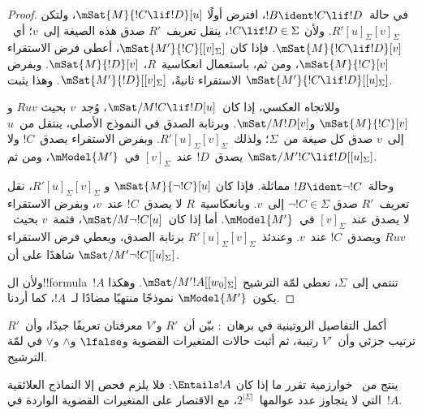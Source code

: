 \documentclass[../../../include/open-logic-section]{subfiles}
\begin{document}
\begin{proof}
  في حالة~$!B\ident !C\lif !D$، افترض أولًا
  $\mSat{M}{!C\lif !D}[u]$، ولتكن
  $R'{[u]_\Sigma}{[v]_\Sigma}$. ولأن
  $!C\lif !D\in\Sigma$، ينقل تعريف~$R'$ صدق هذه الصيغة إلى~$v$؛
  أي~$\mSat{M}{!C\lif !D}[v]$. فإذا كان
  $\mSat{M'}{!C}[{[v]_\Sigma}]$، أعطى فرض الاستقراء
  $\mSat{M}{!C}[v]$، ومن ثم، باستعمال انعكاسية~$R$،
  $\mSat{M}{!D}[v]$. وبفرض الاستقراء ثانيةً،
  $\mSat{M'}{!D}[{[v]_\Sigma}]$. وهذا يثبت
  $\mSat{M'}{!C\lif !D}[{[u]_\Sigma}]$.

  وللاتجاه العكسي، إذا كان~$\mSat/{M}{!C\lif !D}[u]$، وُجد~$v$ بحيث
  $Ruv$ و$\mSat{M}{!C}[v]$ و$\mSat/{M}{!D}[v]$. وبرتابة الصدق في
  النموذج الأصلي، ينتقل من~$u$ إلى~$v$ صدق كل صيغة من~$\Sigma$؛
  ولذلك~$R'{[u]_\Sigma}{[v]_\Sigma}$. وبفرض الاستقراء يصدق~$!C$ ولا
  يصدق~$!D$ عند~$[v]_\Sigma$ في~$\mModel{M'}$، ومن ثم
  $\mSat/{M'}{!C\lif !D}[{[u]_\Sigma}]$.

  وحالة~$!B\ident\lnot !C$ مماثلة. فإذا كان
  $\mSat{M}{\lnot !C}[u]$ و
  $R'{[u]_\Sigma}{[v]_\Sigma}$، نقل تعريف~$R'$ صدق
  $\lnot !C\in\Sigma$ إلى~$v$. وبانعكاسية~$R$ لا يصدق~$!C$ عند~$v$،
  وبفرض الاستقراء لا يصدق عند~$[v]_\Sigma$ في~$\mModel{M'}$. أما إذا
  كان~$\mSat/{M}{\lnot !C}[u]$، فثمة~$v$ بحيث~$Ruv$ ويصدق~$!C$
  عند~$v$. وعندئذ~$R'{[u]_\Sigma}{[v]_\Sigma}$ برتابة الصدق، ويعطي
  فرض الاستقراء شاهدًا على أن
  $\mSat/{M'}{\lnot !C}[{[u]_\Sigma}]$.

  ولأن ال!!{formula}~$!A$ تنتمي إلى~$\Sigma$، تعطي لمّة الترشيح
  $\mSat/{M'}{!A}[{[w_0]_\Sigma}]$. وهكذا يكون~$\mModel{M'}$ نموذجًا
  منتهيًا مضادًا لـ~$!A$، كما أردنا.
\end{proof}

\begin{prob}
أكمل التفاصيل الروتينية في برهان~:
بيّن أن~$R'$ و$V'$ معرفتان تعريفًا جيدًا، وأن~$R'$ ترتيب جزئي وأن~$V'$
رتيبة، ثم أثبت حالات المتغيرات القضوية و$\lfalse$ و$\land$ و$\lor$ في
لمّة الترشيح.
\end{prob}

ينتج من~ خوارزمية تقرر ما إذا كان
$\Entails !A$: فلا يلزم فحص إلا النماذج العلائقية التي لا يتجاوز عدد
عوالمها~$2^{|\Sigma|}$، مع الاقتصار على المتغيرات القضوية الواردة
في~$!A$.
\end{document}
